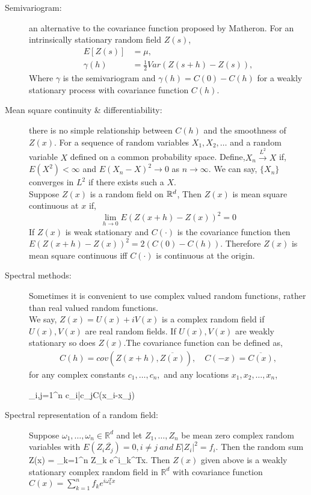 \begin{description}
\item [Semivariogram:] an alternative to the covariance function proposed by Matheron. For an intrinsically stationary random field $Z(s)$,
\begin{align}
E[Z(s)] &= \mu , \nonumber \\
\gamma(h) &= \frac{1}{2} Var(Z(s+h) -Z(s)),
\end{align}
Where $\gamma$ is the semivariogram and $\gamma(h) = C(0) - C(h)$ for a weakly stationary process with covariance function $C(h)$.

\item [Mean square continuity \& differentiability:] there is no simple relationship between $C(h)$ and the smoothness of $Z(x)$. For a sequence of random variables $X_1, X_2,\ldots$ and a random variable $X$ defined on a common probability space. Define,$X_n\overset{L^2}\to X$ if, $E(X^2)<\infty$ and $E(X_n - X)^2\to 0$ as $n \rightarrow \infty$. We can say, $\{X_n\}$ converges in $L^2$ if there exists such a $X$.\\

Suppose $Z(x)$ is a random field on $\mathbb{R}^d$, Then $Z(x)$ is mean square continuous at $x$ if, $$\lim_{h\to 0} E(Z(x+h)-Z(x))^2 =0$$
If $Z(x)$ is weak stationary and $C(\cdot)$ is the covariance function then $E(Z(x+h)-Z(x))^2=2(C(0)-C(h))$. Therefore $Z(x)$ is mean square continuous iff $C(\cdot)$ is continuous at the origin.

\item [Spectral methods:] Sometimes it is convenient to use complex valued random functions, rather than real valued random functions. \\

We say, $Z(x)=U(x) + i V(x)$ is a complex random field if $U(x),V(x)$ are real random fields. If $U(x),V(x)$ are weakly stationary so does $Z(x)$.The covariance function can be defined as,
\begin{eqnarray*}
C(h) = cov(Z(x+h), \overline{Z(x)}), \quad C(-x)=\overline{C(x)},
\end{eqnarray*}
for any complex constants $c_1,\ldots, c_n,$ and any locations $x_1, x_2, \ldots, x_n$,

\beq \sum_{i,j=1}^n c_i\bar{c_j}C(x_i-x_j)\eeq

\item [Spectral representation of a random field:] Suppose $\omega_1,\ldots, \omega_n \in \mathbb{R}^d$ and let $Z_1, \ldots, Z_n$ be mean zero complex random variables with  $E(Z_i\bar{Z_j})=0, i\ne j\ and\ E|Z_i|^2=f_i$. Then the random sum
\beq Z(x) = \sum_{k=1}^n Z_k e^{i\omega_k^Tx}.\eeq
Then $Z(x)$ given above is a weakly stationary complex random field in $\mathbb{R}^d$ with covariance function $C(x) = \sum_{k=1}^n f_k e^{i\omega_k^Tx}$\\


\end{description}
